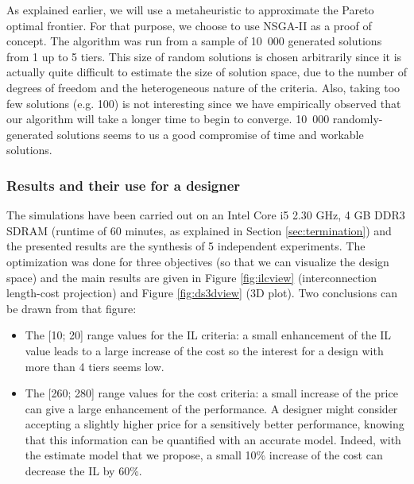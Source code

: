 As explained earlier, we will use a metaheuristic to approximate the Pareto optimal frontier. For that purpose, we choose to use NSGA-II \cite{Deb00afast} as a proof of concept. The algorithm was run from a sample of 10~000 generated solutions from 1 up to 5 tiers. This size of random solutions is chosen arbitrarily since it is actually quite difficult to estimate the size of solution space, due to the number of degrees of freedom and the heterogeneous nature of the criteria. Also, taking too few solutions (e.g. 100) is not interesting since we have empirically observed that our algorithm will take a longer time to begin to converge. 10~000 randomly-generated solutions seems to us a good compromise of time and workable solutions.



\subsubsection{Results and their use for a designer}
\label{sec:results}
The simulations have been carried out on an Intel Core i5 2.30 GHz, 4 GB
DDR3 SDRAM (runtime of 60 minutes, as explained in Section \ref{sec:termination}) and the presented results are the synthesis of 5 independent experiments. The optimization was done for three objectives (so that we can visualize the design space) and the main results are given in Figure \ref{fig:ilcview} (interconnection length-cost projection) and Figure \ref{fig:ds3dview} (3D plot). Two conclusions can be drawn from that figure:
\begin{itemize}
\item The [10; 20] range values for the IL criteria: a small enhancement of the IL value leads to a large increase of the cost so the interest for a design with more than 4 tiers seems low.
\item The [260; 280] range values for the cost criteria: a small increase of the price can give a large enhancement of the performance. A designer might consider accepting a slightly higher price for a sensitively better performance, knowing that this information can be quantified with an accurate model. Indeed, with the estimate model that we propose, a small 10\% increase of the cost can decrease the IL by 60\%.
\end{itemize}

